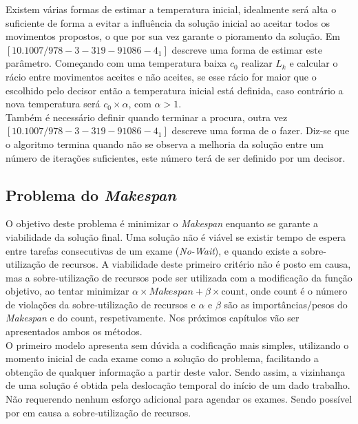 Existem várias formas de estimar a temperatura inicial, idealmente será alta o suficiente de forma a evitar a influência da solução inicial ao aceitar todos os movimentos propostos, o que por sua vez garante o pioramento da solução. Em $[10.1007/978-3-319-91086-4_1]$ descreve uma forma de estimar este parâmetro. Começando com uma temperatura baixa $c_{0}$ realizar $L_{k}$ e calcular o rácio entre movimentos aceites e não aceites, se esse rácio for maior que o escolhido pelo decisor então a temperatura inicial está definida, caso contrário a nova temperatura será $c_{0}\times \alpha$, com $\alpha > 1$.\\

Também é necessário definir quando terminar a procura, outra vez $[10.1007/978-3-319-91086-4_1]$ descreve uma forma de o fazer. Diz-se que o algoritmo termina quando não se observa a melhoria da solução entre um número de iterações suficientes, este número terá de ser definido por um decisor.\\

\subsection{Problema do \textit{Makespan}}

O objetivo deste problema é minimizar o \textit{Makespan} enquanto se garante a viabilidade da solução final. Uma solução não é viável se existir tempo de espera entre tarefas consecutivas de um exame (\textit{No-Wait}), e quando existe a sobre-utilização de recursos. A viabilidade deste primeiro critério não é posto em causa, mas a sobre-utilização de recursos pode ser utilizada com a modificação da função objetivo, ao tentar minimizar $\alpha \times \textit{Makespan} + \beta \times \text{count}$, onde count é o número de violações da sobre-utilização de recursos e $\alpha$ e $\beta$ são as importâncias/pesos do \textit{Makespan} e do count, respetivamente. Nos próximos capítulos vão ser apresentados ambos os métodos.\\

O primeiro modelo apresenta sem dúvida a codificação mais simples, utilizando o momento inicial de cada exame como a solução do problema, facilitando a obtenção de qualquer informação a partir deste valor. Sendo assim, a vizinhança de uma solução é obtida pela deslocação temporal do início de um dado trabalho. Não requerendo nenhum esforço adicional para agendar os exames. Sendo possível por em causa a sobre-utilização de recursos.\\

